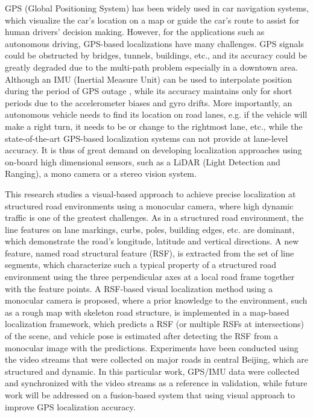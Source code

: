 \documentclass[letterpaper, 10 pt, conference]{ieeeconf}  %
\begin{document}
GPS (Global Positioning System) has been widely used in car navigation systems, which visualize the car's location on a map or guide the car's route to assist for human drivers' decision making.
However, for the applications such as autonomous driving, GPS-based localizations have many challenges.
GPS signals could be obstructed by bridges, tunnels, buildings, etc., and its accuracy could be greatly degraded due to the multi-path problem especially in a downtown area. Although an IMU (Inertial Measure Unit) can be used to interpolate position during the period of GPS outage \cite{caron2006gps}, while its accuracy maintains only for short periods due to the accelerometer biases and gyro drifts.
More importantly, an autonomous vehicle needs to find its location on road lanes, e.g. if the vehicle will make a right turn, it needs to be or change to the rightmost lane, etc., while the state-of-the-art GPS-based localization systems can not provide at lane-level accuracy. It is thus of great demand on developing localization approaches using on-board high dimensional sensors, such as a LiDAR (Light Detection and Ranging), a mono camera or a stereo vision system.

This research studies a visual-based approach to achieve precise localization at structured road environments using a monocular camera, where high dynamic traffic is one of the greatest challenges.
As in a structured road environment, the line features on lane markings, curbs, poles, building edges, etc. are dominant, which demonstrate the road's longitude, latitude and vertical directions.
A new feature, named road structural feature (RSF), is extracted from the set of line segments, which characterize such a typical property of a structured road environment using the three perpendicular axes at a local road frame together with the feature points.
A RSF-based visual localization method using a monocular camera is proposed, where a prior knowledge to the environment, such as a rough map with skeleton road structure, is implemented in a map-based localization framework, which predicts a RSF (or multiple RSFs at intersections) of the scene, and vehicle pose is estimated after detecting the RSF from a monocular image with the predictions.
Experiments have been conducted using the video streams that were collected on major roads in central Beijing, which are structured and dynamic. In this particular work, GPS/IMU data were collected and synchronized with the video streams as a reference in validation, while future work will be addressed on a fusion-based system that using visual approach to improve GPS localization accuracy.
\end{document}
